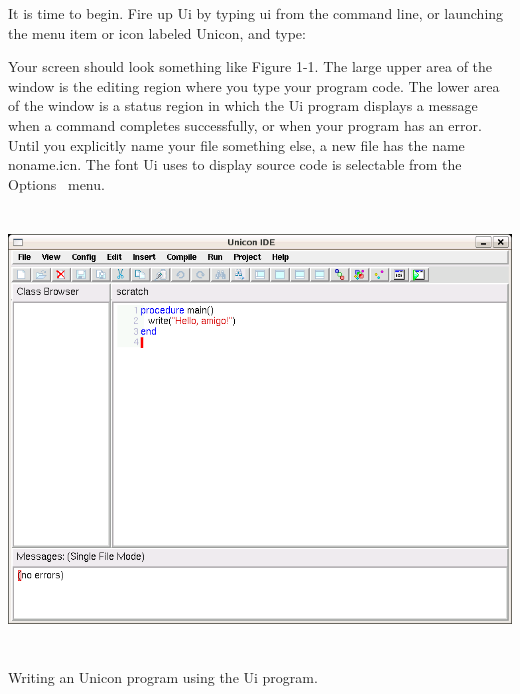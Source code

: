 It is time to begin. Fire up Ui by typing
{\textquotedbl}ui{\textquotedbl} from the command line, or launching
the menu item or icon labeled {\textquotedbl}Unicon,{\textquotedbl} and
type:


Your screen should look
something like Figure 1-1. The large upper area of the window is the
editing region where you type your program code. The lower area of the
window is a status region in which the Ui program displays a message
when a command completes successfully, or when your program has an
error. Until you explicitly name your file something else, a new file
has the name \textsf{noname.icn}. The font Ui uses to display
source code is selectable from the Options \ menu.

\begin{center}
\includegraphics[width=6in,height=4.5953in]{ub-img/ub-img5.png}
\end{center}
\vspace{-0.25cm}{\sffamily\bfseries Figure 1-1:}
{\sffamily Writing an Unicon program using the Ui program.}

\bigskip

